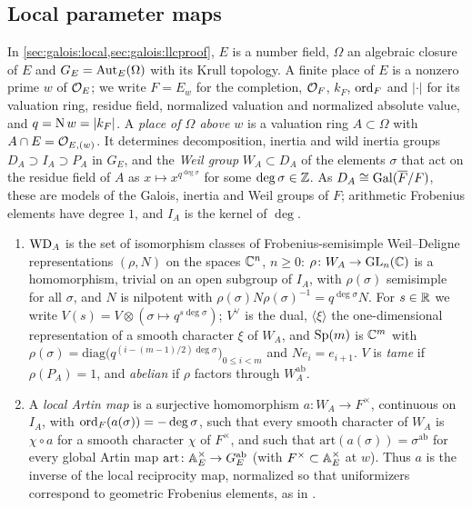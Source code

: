 \subsection{Local parameter maps}\label{sec:galois:local}

In \cref{sec:galois:local,sec:galois:llcproof}, $E$ is a number field, $\Omega$ an algebraic closure
of $E$ and $G_E=\operatorname{Aut}_E(\Omega)$ with its Krull topology. A finite place of $E$ is a nonzero prime $w$
of $\mathcal{O}_E$; we write $F=E_w$ for the completion, $\mathcal{O}_F$, $k_F$, $\operatorname{ord}_F$ and $|\cdot|$ for its
valuation ring, residue field, normalized valuation and normalized absolute value, and $q=\operatorname{N} w=|k_F|$.
A \emph{place of $\Omega$ above $w$} is a valuation ring $A\subset\Omega$ with
$A\cap E=\mathcal{O}_{E,(w)}$. It determines decomposition, inertia and wild inertia groups
$D_A\supset I_A\supset P_A$ in $G_E$, and the \emph{Weil group} $W_A\subset D_A$ of the elements
$\sigma$ that act on the residue field of $A$ as $x\mapsto x^{q^{\deg\sigma}}$ for some
$\deg\sigma\in\mathbb{Z}$. As $D_A\cong\operatorname{Gal}(\overline F/F)$, these are models of the Galois, inertia and Weil
groups of $F$; arithmetic Frobenius elements have degree $1$, and $I_A$ is the kernel of $\deg$.

\begin{definition}\label{def:galois:wd}
\begin{enumerate}[label=(\alph*),nosep]
\item $\mathrm{WD}_A$ is the set of isomorphism classes of Frobenius-semisimple Weil--Deligne
  representations $(\rho,N)$ on the spaces $\mathbb{C}^n$, $n\ge0$: $\rho\colon W_A\to\operatorname{GL}_n(\mathbb{C})$ is a
  homomorphism, trivial on an open subgroup of $I_A$, with $\rho(\sigma)$ semisimple for all
  $\sigma$, and $N$ is nilpotent with $\rho(\sigma)N\rho(\sigma)^{-1}=q^{\deg\sigma}N$. For $s\in\mathbb{R}$ we
  write $V(s)=V\otimes(\sigma\mapsto q^{s\deg\sigma})$; $V^\vee$ is the dual, $\langle\xi\rangle$ the
  one-dimensional representation of a smooth character $\xi$ of $W_A$, and $\operatorname{Sp}(m)$ is $\mathbb{C}^m$
  with $\rho(\sigma)=\mathrm{diag}\bigl(q^{(i-(m-1)/2)\deg\sigma}\bigr)_{0\le i<m}$ and $Ne_i=e_{i+1}$.
  $V$ is \emph{tame} if $\rho(P_A)=1$, and \emph{abelian} if $\rho$ factors through $W_A^{\mathrm{ab}}$.
\item A \emph{local Artin map} is a surjective homomorphism $a\colon W_A\to F^\times$, continuous on
  $I_A$, with $\operatorname{ord}_F(a(\sigma))=-\deg\sigma$, such that every smooth character of $W_A$ is $\chi\circ
  a$ for a smooth character $\chi$ of $F^\times$, and such that $\mathrm{art}(a(\sigma))=\sigma^{\mathrm{ab}}$
  for every global Artin map $\mathrm{art}\colon\mathbb{A}_E^\times\to G_E^{\mathrm{ab}}$ (with $F^\times\subset
  \mathbb{A}_E^\times$ at $w$). Thus $a$ is the inverse of the local reciprocity map, normalized so that
  uniformizers correspond to geometric Frobenius elements, as in \cite{Deligne1973,HarrisTaylor2001}.
\end{enumerate}
\end{definition}

